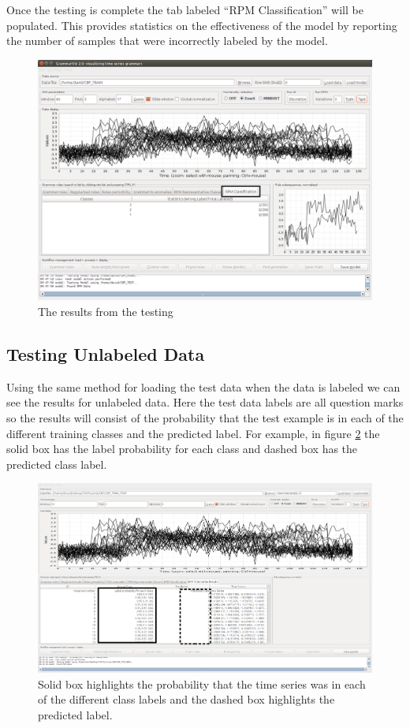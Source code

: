\documentclass[letterpaper, 12pt]{article}
\begin{document}
\newpage
Once the testing is complete the tab labeled ``RPM Classification'' will be populated. This provides statistics on the effectiveness of the model by reporting the number of samples that were incorrectly labeled by the model.

\begin{figure}[H]
	\includegraphics[width=\textwidth]{TSAT-testing-step-2}
	\caption{The results from the testing}
	\label{fig:TSAT-testing-step-2}
\end{figure}

\subsection{Testing Unlabeled Data}
Using the same method for loading the test data when the data is labeled we can see the results for unlabeled data.  Here the test data labels are all question marks so the results will consist of the probability that the test example is in each of the different training classes and the predicted label.  For example, in figure \ref{fig:TSAT-Results-Unknown-Test} the solid box has the label probability for each class and dashed box has the predicted class label.
\begin{figure}[H]
	\includegraphics[width=\textwidth]{RPMTimeSeriesResultsUnknown}
	\caption{Solid box highlights the probability that the time series was in each of the different class labels and the dashed box highlights the predicted label.}
	\label{fig:TSAT-Results-Unknown-Test}
\end{figure}
\end{document}
